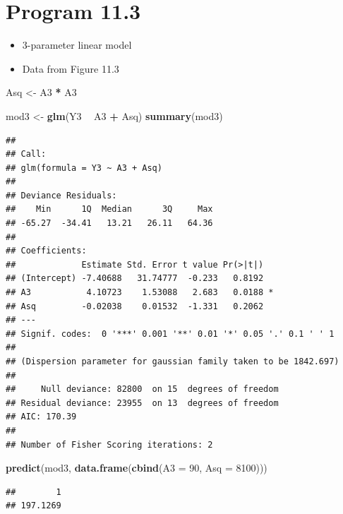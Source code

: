 \documentclass[
  10pt,
]{book}
\newenvironment{Shaded}{\begin{snugshade}}{\end{snugshade}}
\newcommand{\DataTypeTok}[1]{\textcolor[rgb]{0.13,0.29,0.53}{#1}}
\newcommand{\DecValTok}[1]{\textcolor[rgb]{0.00,0.00,0.81}{#1}}
\newcommand{\KeywordTok}[1]{\textcolor[rgb]{0.13,0.29,0.53}{\textbf{#1}}}
\newcommand{\NormalTok}[1]{#1}
\newcommand{\OperatorTok}[1]{\textcolor[rgb]{0.81,0.36,0.00}{\textbf{#1}}}
\newcommand{\StringTok}[1]{\textcolor[rgb]{0.31,0.60,0.02}{#1}}
\providecommand{\tightlist}{%
  \setlength{\itemsep}{0pt}\setlength{\parskip}{0pt}}
\begin{document}
\hypertarget{program-11.3}{%
\section{Program 11.3}\label{program-11.3}}

\begin{itemize}
\tightlist
\item
  3-parameter linear model
\item
  Data from Figure 11.3
\end{itemize}

\begin{Shaded}
\begin{Highlighting}[]
\NormalTok{Asq <-}\StringTok{ }\NormalTok{A3 }\OperatorTok{*}\StringTok{ }\NormalTok{A3}

\NormalTok{mod3 <-}\StringTok{ }\KeywordTok{glm}\NormalTok{(Y3 }\OperatorTok{~}\StringTok{ }\NormalTok{A3 }\OperatorTok{+}\StringTok{ }\NormalTok{Asq)}
\KeywordTok{summary}\NormalTok{(mod3)}
\end{Highlighting}
\end{Shaded}

\begin{verbatim}
## 
## Call:
## glm(formula = Y3 ~ A3 + Asq)
## 
## Deviance Residuals: 
##    Min      1Q  Median      3Q     Max  
## -65.27  -34.41   13.21   26.11   64.36  
## 
## Coefficients:
##             Estimate Std. Error t value Pr(>|t|)  
## (Intercept) -7.40688   31.74777  -0.233   0.8192  
## A3           4.10723    1.53088   2.683   0.0188 *
## Asq         -0.02038    0.01532  -1.331   0.2062  
## ---
## Signif. codes:  0 '***' 0.001 '**' 0.01 '*' 0.05 '.' 0.1 ' ' 1
## 
## (Dispersion parameter for gaussian family taken to be 1842.697)
## 
##     Null deviance: 82800  on 15  degrees of freedom
## Residual deviance: 23955  on 13  degrees of freedom
## AIC: 170.39
## 
## Number of Fisher Scoring iterations: 2
\end{verbatim}

\begin{Shaded}
\begin{Highlighting}[]
\KeywordTok{predict}\NormalTok{(mod3, }\KeywordTok{data.frame}\NormalTok{(}\KeywordTok{cbind}\NormalTok{(}\DataTypeTok{A3 =} \DecValTok{90}\NormalTok{, }\DataTypeTok{Asq =} \DecValTok{8100}\NormalTok{)))}
\end{Highlighting}
\end{Shaded}

\begin{verbatim}
##        1 
## 197.1269
\end{verbatim}
\end{document}
